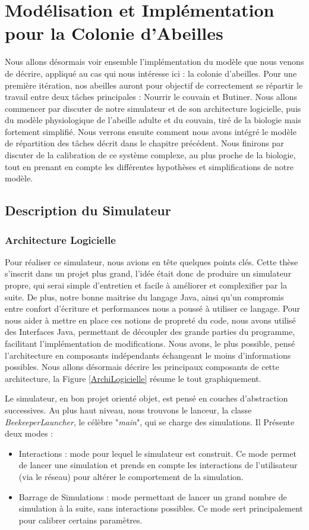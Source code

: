 \chapter{Modélisation et Implémentation pour la Colonie d'Abeilles}

	Nous allons désormais voir ensemble l'implémentation du modèle que nous venons de décrire, appliqué au cas qui nous intéresse ici : la colonie d'abeilles. Pour une première itération, nos abeilles auront pour objectif de correctement se répartir le travail entre deux tâches principales : Nourrir le couvain et Butiner. Nous allons commencer par discuter de notre simulateur et de son architecture logicielle, puis du modèle physiologique de l'abeille adulte et du couvain, tiré de la biologie mais fortement simplifié. Nous verrons ensuite comment nous avons intégré le modèle de répartition des tâches décrit dans le chapitre précédent. Nous finirons par discuter de la calibration de ce système complexe, au plus proche de la biologie, tout en prenant en compte les différentes hypothèses et simplifications de notre modèle.
	
	\section{Description du Simulateur}
		\subsection{Architecture Logicielle}
			Pour réaliser ce simulateur, nous avions en tête quelques points clés. Cette thèse s'inscrit dans un projet plus grand, l'idée était donc de produire un simulateur propre, qui serai simple d'entretien et facile à améliorer et complexifier par la suite. De plus, notre bonne maitrise du langage Java, ainsi qu'un compromis entre confort d'écriture et performances nous a poussé à utiliser ce langage. Pour nous aider à mettre en place ces notions de propreté du code, nous avons utilisé des Interfaces Java, permettant de découpler des grande parties du programme, facilitant l'implémentation de modifications. Nous avons, le plus possible, pensé l'architecture en composants indépendants échangeant le moins d'informations possibles. Nous allons désormais décrire les principaux composants de cette architecture, la Figure \ref{ArchiLogicielle} résume le tout graphiquement.
			
			Le simulateur, en bon projet orienté objet, est pensé en couches d'abstraction successives. Au plus haut niveau, nous trouvons le lanceur, la classe \textit{BeekeeperLauncher}, le célèbre "\textit{main}", qui se charge des simulations. Il Présente deux modes :
	\begin{itemize}
		\item Interactions : mode pour lequel le simulateur est construit. Ce mode permet de lancer une simulation et prends en compte les interactions de l'utilisateur (via le réseau) pour altérer le comportement de la simulation.
		\item Barrage de Simulations : mode permettant de lancer un grand nombre de simulation à la suite, sans interactions possibles. Ce mode sert principalement pour calibrer certains paramètres.
	\end{itemize}				
			
